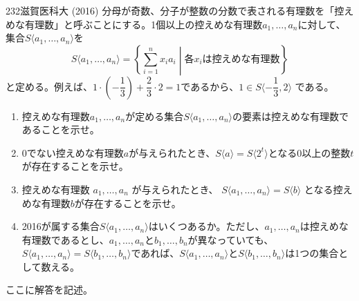 \begin{prob}{232}{}{滋賀医科大 (2016)}
 分母が奇数、分子が整数の分数で表される有理数を「控えめな有理数」と呼ぶことにする。1個以上の控えめな有理数$a_1,\dots,a_n$に対して、集合$S\langle a_1,\dots, a_n \rangle$を
\[ S\langle a_1,\dots,a_n\rangle=\left\{\sum_{i=1}^n x_ia_i \middle| \text{各$x_i$は控えめな有理数}\right\} \]
 と定める。例えば、$1\cdot\left(-\dfrac{1}{3}\right)+\dfrac{2}{3}\cdot 2=1$であるから、$1\in S\langle -\dfrac{1}{3},2\rangle$ である。
 \begin{enumerate}
  \item 控えめな有理数$a_1,\dots, a_n$が定める集合$S\langle a_1,\dots,a_n\rangle$の要素は控えめな有理数であることを示せ。
  \item 0でない控えめな有理数$a$が与えられたとき、$S\langle a\rangle=S\langle 2^t \rangle$となる0以上の整数$t$が存在することを示せ。
  \item 控えめな有理数 $a_1,\dots,a_n$ が与えられたとき、 $S\langle a_1,\dots,a_n\rangle=S\langle b\rangle$ となる控えめな有理数$b$が存在することを示せ。
  \item 2016が属する集合$S\langle a_1,\dots,a_n\rangle$はいくつあるか。ただし、$a_1,\dots,a_n$は控えめな有理数であるとし、$a_1,\dots,a_n$と$b_1,\dots,b_n$が異なっていても、$S\langle a_1,\dots,a_n\rangle =S\langle b_1,\dots,b_n\rangle$であれば、$S\langle a_1,\dots,a_n\rangle$と$S\langle b_1,\dots,b_n\rangle$は1つの集合として数える。
 \end{enumerate}
\end{prob}
ここに解答を記述。